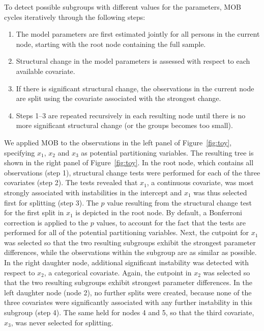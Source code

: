 \documentclass[doc,floatsintext,natbib]{apa7}
\begin{document}
To detect possible subgroups with different values for the parameters, MOB cycles iteratively through the following steps:

\begin{enumerate}
\setlength\itemsep{0.25em}
\item The model parameters are first estimated jointly for all persons in the current node, starting with the root node containing the full sample.
\item Structural change in the model parameters is assessed with respect to each available covariate.
\item If there is significant structural change, the observations in the current node are split using the covariate associated with the strongest change.
\item Steps 1--3 are repeated recursively in each resulting node until there is no more significant structural change (or the groups becomes too small).
\end{enumerate}

We applied MOB to the observations in the left panel of Figure~\ref{fig:toy}, specifying $x_1$, $x_2$ and $x_3$ as potential partitioning variables. The resulting tree is shown in the right panel of Figure~\ref{fig:toy}. In the root node, which contains all observations (step 1), structural change tests were performed for each of the three covariates (step 2). The tests revealed that $x_1$, a continuous covariate, was most strongly associated with instabilities in the intercept and $x_1$ was thus selected first for splitting (step 3). The $p$ value resulting from the structural change test for the first split in $x_1$ is depicted in the root node. By default, a Bonferroni correction is applied to the $p$ values, to account for the fact that the tests are performed for all of the potential partitioning variables. Next, the cutpoint for $x_1$ was selected so that the two resulting subgroups exhibit the strongest parameter differences, while the observations within the subgroup are as similar as possible. In the right daughter node, additional significant instability was detected with respect to $x_2$, a categorical covariate. Again, the cutpoint in $x_2$ was selected so that the two resulting subgroups exhibit strongest parameter differences. In the left daughter node (node 2), no further splits were created, because none of the three covariates were significantly associated with any further instability in this subgroup (step 4). The same held for nodes 4 and 5, so that the third covariate, $x_3$, was never selected for splitting. 
\end{document}
